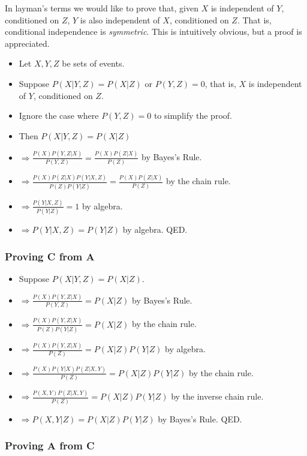 \documentclass{article}
\begin{document}
In layman's terms we would like to prove that, given $X$ is 
independent of $Y$, conditioned on $Z$, $Y$ is also independent of $X$, 
conditioned on $Z$. That is, conditional independence is \textit{symmetric}. 
This is intuitively obvious, but a proof is appreciated.
\begin{itemize}
    \item Let $X, Y, Z$ be sets of events.
    \item Suppose $P(X | Y, Z) = P(X | Z)$ or $P(Y, Z) = 0$, that is, $X$ is 
independent of $Y$, conditioned on $Z$.
    \item Ignore the case where $P(Y, Z) = 0$ to simplify the proof.
    \item Then $P(X | Y, Z) = P(X | Z)$
    \item $\Rightarrow \frac{P(X)P(Y,Z|X)}{P(Y,Z)} = \frac{P(X)P(Z|X)}{P(Z)}$ by Bayes's 
Rule.
    \item $\Rightarrow \frac{P(X)P(Z|X)P(Y|X,Z)}{P(Z)P(Y|Z)} = \frac{P(X)P(Z|X)}{P(Z)}$ by the chain rule.
    \item $\Rightarrow \frac{P(Y|X,Z)}{P(Y|Z)} = 1$ by algebra.
    \item $\Rightarrow P(Y|X,Z) = P(Y|Z)$ by algebra. QED.
\end{itemize}

\subsubsection{Proving C from A}

\begin{itemize}
    \item Suppose $P(X|Y,Z) = P(X|Z)$.
    \item $\Rightarrow \frac{P(X)P(Y,Z|X)}{P(Y,Z)} = P(X|Z)$ by Bayes's Rule.
    \item $\Rightarrow \frac{P(X)P(Y,Z|X)}{P(Z)P(Y|Z)} = P(X|Z)$ by the chain rule.
    \item $\Rightarrow \frac{P(X)P(Y,Z|X)}{P(Z)} = P(X|Z)P(Y|Z)$ by algebra.
    \item $\Rightarrow \frac{P(X)P(Y|X)P(Z|X,Y)}{P(Z)} = P(X|Z)P(Y|Z)$ by the chain rule.
    \item $\Rightarrow \frac{P(X,Y)P(Z|X,Y)}{P(Z)} = P(X|Z)P(Y|Z)$ by the inverse chain rule.
    \item $\Rightarrow P(X,Y|Z) = P(X|Z)P(Y|Z)$ by Bayes's Rule. QED.
\end{itemize}

\subsubsection{Proving A from C}
\end{document}
